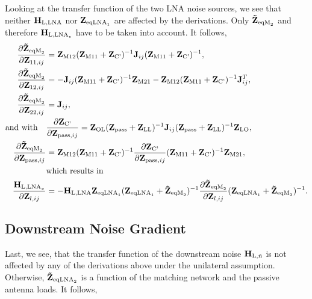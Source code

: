 Looking at the transfer function of the two LNA noise sources, we see that neither $\mathbf{H}_\text{L,LNA}$ nor $\mathbf{Z}_{\text{eqLNA}_1}$ are affected by the derivations.
Only $\mathbf{\tilde{Z}}_{\text{eqM}_2}$ and therefore $\mathbf{H}_{\text{L,LNA}_v}$ have to be taken into account.
It follows,
\begin{align}
\label{eq:HLNAM_sig_grad}
\frac{\partial\mathbf{\tilde{Z}}_{\text{eqM}_2}}{\partial\mathbf{Z}_{11,ij}}&=
\mathbf{Z}_\text{M12} (\mathbf{Z}_\text{M11} + \mathbf{Z}_\text{C'})^{-1}
	\mathbf{J}_{ij}(\mathbf{Z}_\text{M11} + \mathbf{Z}_\text{C'})^{-1},\\
\frac{\partial\mathbf{\tilde{Z}}_{\text{eqM}_2}}{\partial\mathbf{Z}_{12,ij}}&=
-\mathbf{J}_{ij} (\mathbf{Z}_\text{M11} + \mathbf{Z}_\text{C'})^{-1} \mathbf{Z}_\text{M21} 
	-\mathbf{Z}_\text{M12} (\mathbf{Z}_\text{M11} + \mathbf{Z}_\text{C'})^{-1} \mathbf{J}_{ij}^T,\\
\frac{\partial\mathbf{\tilde{Z}}_{\text{eqM}_2}}{\partial\mathbf{Z}_{22,ij}}&=\mathbf{J}_{ij},\\\nonumber
\text{and with}\quad&
\frac{\partial\mathbf{Z}_\text{C'}}{\partial\mathbf{Z}_{\text{pass},ij}} = 
\mathbf{Z}_\text{OL} (\mathbf{Z}_{\text{pass}}+\mathbf{Z}_\text{LL})^{-1} \mathbf{J}_{ij}
	(\mathbf{Z}_{\text{pass}}+\mathbf{Z}_\text{LL})^{-1} \mathbf{Z}_\text{LO},\\
\frac{\partial\mathbf{\tilde{Z}}_{\text{eqM}_2}}{\partial\mathbf{Z}_{\text{pass},ij}}&=
\mathbf{Z}_\text{M12} (\mathbf{Z}_\text{M11} + \mathbf{Z}_\text{C'})^{-1}
	\frac{\partial\mathbf{Z}_\text{C'}}{\partial\mathbf{Z}_{\text{pass},ij}}
	(\mathbf{Z}_\text{M11} + \mathbf{Z}_\text{C'})^{-1}\mathbf{Z}_\text{M21},\\\nonumber
\qquad&\text{which results in}\\
\label{eq:HLNAM_sig_grad_22}
\frac{\mathbf{H}_{\text{L,LNA}_v}}{\partial\mathbf{Z}_{l,ij}}&=
-\mathbf{H}_\text{L,LNA} \mathbf{Z}_{\text{eqLNA}_1} 
	(\mathbf{Z}_{\text{eqLNA}_1} + \mathbf{\tilde{Z}}_{\text{eqM}_2})^{-1}
		\frac{\partial\mathbf{\tilde{Z}}_{\text{eqM}_2}}{\partial\mathbf{Z}_{l,ij}}
	(\mathbf{Z}_{\text{eqLNA}_1} + \mathbf{\tilde{Z}}_{\text{eqM}_2})^{-1}.
\end{align}


\subsection{Downstream Noise Gradient}
\label{sec:down_noise_grad}
Last, we see, that the transfer function of the downstream noise $\mathbf{H}_{\text{L},\tilde{n}}$ is not affected by any of the derivations above under the unilateral assumption.
Otherwise, $\mathbf{\tilde{Z}}_{\text{eqLNA}_2}$ is a function of the matching network and the passive antenna loads. It follows,

